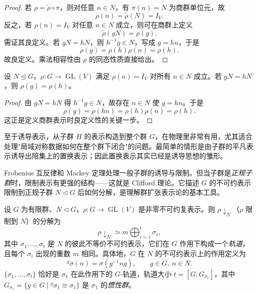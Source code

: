\begin{proof}
若 $\rho=\widetilde\rho\circ\pi$，则对任意 $n\in N$，有 $\pi(n)=N$ 为商群单位元，故
\[
\rho(n)=\widetilde\rho(N)=I_V.
\]
反之，若 $\rho(n)=I_V$ 对任意 $n\in N$ 成立，则可在商群上定义
\[
\widetilde\rho(gN)=\rho(g).
\]
需证其良定义。若 $gN=hN$，则 $h^{-1}g\in N$，写成 $g=hn$，于是
\[
\rho(g)=\rho(h)\rho(n)=\rho(h).
\]
故良定义。乘法相容性由 $\rho$ 的同态性质直接给出。
\end{proof}

\begin{proposition}
设 $N\mathrel{\trianglelefteq} G$，$\rho:G\to\operatorname{GL}(V)$ 满足 $\rho(n)=I_V$ 对所有 $n\in N$ 成立。若 $gN=hN$，则 $\rho(g)=\rho(h)$。
\end{proposition}

\begin{proof}
由 $gN=hN$ 得 $h^{-1}g\in N$，故存在 $n\in N$ 使 $g=hn$。于是
\[
\rho(g)=\rho(hn)=\rho(h)\rho(n)=\rho(h).
\]
这正是定义商群表示时良定义性的关键一步。
\end{proof}


至于诱导表示，从子群 $H$ 的表示构造到整个群 $G$，在物理里非常有用，尤其适合处理"局域对称数据如何在整个群下闭合"的问题。最简单的情形是由子群的平凡表示诱导出陪集上的置换表示；因此置换表示其实已经是诱导思想的雏形。


Frobenius 互反律和 Mackey 定理处理一般子群的诱导与限制。但当子群是\emph{正规子群}时，限制表示有更强的结构——这就是 Clifford 理论。它描述 $G$ 的不可约表示限制到正规子群 $N\triangleleft G$ 后如何分解，是理解群扩张表示论的基本工具。

\begin{theorem}[Clifford 定理]
设 $G$ 为有限群、$N\triangleleft G$，$\rho:G\to\operatorname{GL}(V)$ 是非零不可约复表示。则 $\rho\downarrow_N$（$\rho$ 限制到 $N$）的分解为
\begin{equation}
\rho\downarrow_N\simeq m\bigoplus_{i=1}^{t}\sigma_i,
\label{eq:clifford-decomposition}
\end{equation}
其中 $\sigma_1,\dots,\sigma_t$ 是 $N$ 的彼此不等价不可约表示，它们在 $G$ 作用下构成一个\emph{轨道}，且每个 $\sigma_i$ 出现的重数 $m$ 相同。具体地，$G$ 在 $N$ 的不可约表示上的作用定义为
\begin{equation}
{}^g\sigma(n)=\sigma(g^{-1}ng),\qquad g\in G,\ n\in N.
\label{eq:conjugate-representation}
\end{equation}
$\{\sigma_1,\dots,\sigma_t\}$ 恰好是 $\sigma_1$ 在此作用下的 $G$-轨道，轨道大小 $t=[G:G_{\sigma_1}]$，其中 $G_{\sigma_1}=\{g\in G\mid{}^g\sigma_1\cong\sigma_1\}$ 是 $\sigma_1$ 的\emph{惯性群}。
\label{thm:clifford}
\end{theorem}

